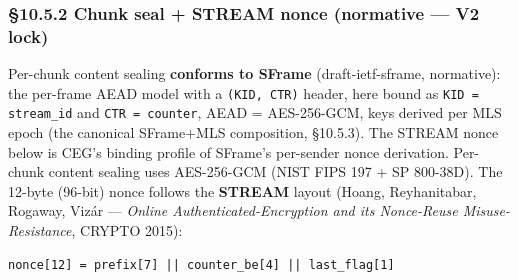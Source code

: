 \documentclass[11pt]{article}
\begin{document}
\subsubsection*{§10.5.2 Chunk seal + STREAM nonce (normative — V2 lock)}


Per-chunk content sealing \textbf{conforms to SFrame} (draft-ietf-sframe, normative): the per-frame AEAD model with a \texttt{(KID, CTR)} header, here bound as \texttt{KID = stream\_id} and \texttt{CTR = counter}, AEAD = AES-256-GCM, keys derived per MLS epoch (the canonical SFrame+MLS composition, §10.5.3). The STREAM nonce below is CEG's binding profile of SFrame's per-sender nonce derivation. Per-chunk content sealing uses AES-256-GCM (NIST FIPS 197 + SP 800-38D). The 12-byte (96-bit) nonce follows the \textbf{STREAM} layout (Hoang, Reyhanitabar, Rogaway, Vizár — \textit{Online Authenticated-Encryption and its Nonce-Reuse Misuse-Resistance}, CRYPTO 2015):


\begin{lstlisting}
nonce[12] = prefix[7] || counter_be[4] || last_flag[1]
\end{lstlisting}
\end{document}
